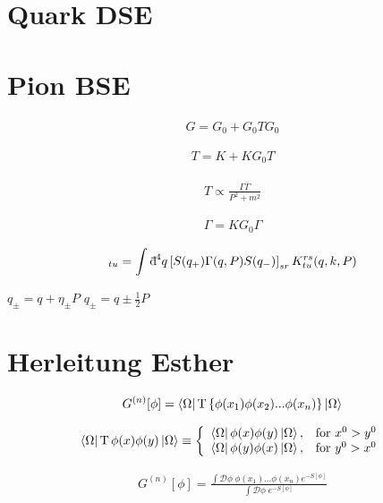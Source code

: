 \documentclass[oneside, openany]{book}
\numberwithin{equation}{chapter}
\numberwithin{figure}{chapter}
\newcommand{\dbar}{\mathord{\mathrm{d}\mkern-8mu\raisebox{0.55em}{\rule{0.38em}{0.05em}}\mkern0.1mu}}
\begin{document}
\section{Quark DSE}



\section{Pion BSE}

\begin{align}
	G = G_0 + G_0 T G_0
\end{align}

\begin{align}
T = K + K G_0 T
\end{align}

\begin{align}
	T \propto \frac{\Gamma \bar\Gamma}{P^2 + m^2}
\end{align}

\begin{align}
	\Gamma = K G_0 \Gamma
\end{align}

\begin{align}
	[\Gamma(p,P)]_{tu} = \int \dbar^4 q \left[ S(q_+) \Gamma(q,P) S(q_-) \right]_{sr} K^{rs}_{tu}(q,k,P)
\end{align}

$q_\pm = q + \eta_\pm P$
$q_\pm = q \pm \tfrac{1}{2} P$

\section{Herleitung Esther}

\begin{align}
	G^{(n)}[\phi] = \bra{\Omega} \mathrm{T}\left\{ \phi(x_1)\phi(x_2)...\phi(x_n) \right\} \ket{\Omega}
\end{align}

\begin{align}
	\bra{\Omega} \mathrm{T}\, \phi(x)\phi(y) \ket{\Omega} \equiv
	\left\{
	\begin{array}{ll}
		\bra{\Omega} \phi(x)\phi(y) \ket{\Omega}, & \text{for } x^0 > y^0 \\
		\bra{\Omega} \phi(y)\phi(x) \ket{\Omega}, & \text{for } y^0 > x^0
	\end{array}
	\right.
\end{align}

\begin{align}
	G^{(n)}[\phi] = \frac{\int\mathcal D \phi \; \phi(x_1)...\phi(x_n)e^{-S[\phi]}}{\int\mathcal D \phi \;e^{-S[\phi]}}
\end{align}
\end{document}
